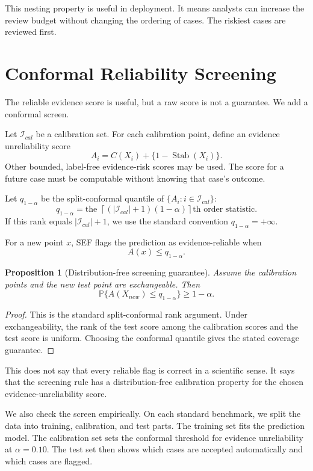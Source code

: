 \documentclass[11pt]{article}
\newtheorem{proposition}{Proposition}
\newcommand{\Pp}{\mathbb{P}}
\begin{document}
This nesting property is useful in deployment. It means analysts can increase the review budget without changing the ordering of cases. The riskiest cases are reviewed first.

\section{Conformal Reliability Screening}

The reliable evidence score is useful, but a raw score is not a guarantee. We add a conformal screen.

Let $\mathcal{I}_{cal}$ be a calibration set. For each calibration point, define an evidence unreliability score
\[
A_i
=
C(X_i)+\{1-\operatorname{Stab}(X_i)\}.
\]
Other bounded, label-free evidence-risk scores may be used. The score for a
future case must be computable without knowing that case's outcome.

Let $q_{1-\alpha}$ be the split-conformal quantile of $\{A_i:i\in\mathcal{I}_{cal}\}$:
\[
q_{1-\alpha}
=
\text{the }
\left\lceil (|\mathcal{I}_{cal}|+1)(1-\alpha)\right\rceil
\text{th order statistic.}
\]
If this rank equals $|\mathcal{I}_{cal}|+1$, we use the standard convention
$q_{1-\alpha}=+\infty$.

For a new point $x$, SEF flags the prediction as evidence-reliable when
\[
A(x)\leq q_{1-\alpha}.
\]

\begin{proposition}[Distribution-free screening guarantee]
Assume the calibration points and the new test point are exchangeable. Then
\[
\Pp\{A(X_{new})\leq q_{1-\alpha}\}\geq 1-\alpha.
\]
\end{proposition}

\begin{proof}
This is the standard split-conformal rank argument. Under exchangeability, the rank of the test score among the calibration scores and the test score is uniform. Choosing the conformal quantile gives the stated coverage guarantee.
\end{proof}

This does not say that every reliable flag is correct in a scientific sense. It says that the screening rule has a distribution-free calibration property for the chosen evidence-unreliability score.

We also check the screen empirically. On each standard benchmark, we split the data into training, calibration, and test parts. The training set fits the prediction model. The calibration set sets the conformal threshold for evidence unreliability at $\alpha=0.10$. The test set then shows which cases are accepted automatically and which cases are flagged.
\end{document}
